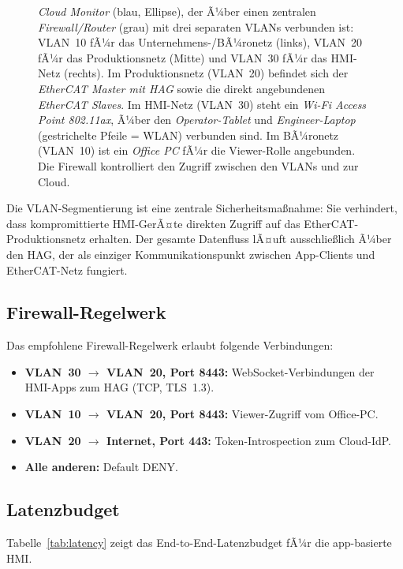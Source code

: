 ﻿\documentclass[12pt,a4paper]{article}
\begin{document}
\begin{figure}[h]
{  \emph{Cloud Monitor} (blau, Ellipse), der Ã¼ber einen zentralen \emph{Firewall/Router}
  (grau) mit drei separaten VLANs verbunden ist: VLAN~10 fÃ¼r das
  Unternehmens-/BÃ¼ronetz (links), VLAN~20 fÃ¼r das Produktionsnetz (Mitte) und
  VLAN~30 fÃ¼r das HMI-Netz (rechts). Im Produktionsnetz (VLAN~20) befindet sich der
  \emph{EtherCAT Master mit HAG} sowie die direkt angebundenen
  \emph{EtherCAT Slaves}. Im HMI-Netz (VLAN~30) steht ein \emph{Wi-Fi Access Point
  802.11ax}, Ã¼ber den \emph{Operator-Tablet} und \emph{Engineer-Laptop}
  (gestrichelte Pfeile = WLAN) verbunden sind. Im BÃ¼ronetz (VLAN~10) ist ein
  \emph{Office PC} fÃ¼r die Viewer-Rolle angebunden. Die Firewall kontrolliert den
  Zugriff zwischen den VLANs und zur Cloud.}
\label{fig:network_diagram}
\end{figure}

Die VLAN-Segmentierung ist eine zentrale Sicherheitsma\ss{}nahme: Sie verhindert, dass
kompromittierte HMI-GerÃ¤te direkten Zugriff auf das EtherCAT-Produktionsnetz erhalten.
Der gesamte Datenfluss lÃ¤uft ausschlie\ss{}lich Ã¼ber den HAG, der als einziger
Kommunikationspunkt zwischen App-Clients und EtherCAT-Netz fungiert.

\subsection{Firewall-Regelwerk}

Das empfohlene Firewall-Regelwerk erlaubt folgende Verbindungen:

\begin{itemize}[leftmargin=2em]
  \item \textbf{VLAN~30 $\to$ VLAN~20, Port 8443:} WebSocket-Verbindungen der HMI-Apps
    zum HAG (TCP, TLS~1.3).
  \item \textbf{VLAN~10 $\to$ VLAN~20, Port 8443:} Viewer-Zugriff vom Office-PC.
  \item \textbf{VLAN~20 $\to$ Internet, Port 443:} Token-Introspection zum Cloud-IdP.
  \item \textbf{Alle anderen:} Default DENY.
\end{itemize}

\subsection{Latenzbudget}

Tabelle~\ref{tab:latency} zeigt das End-to-End-Latenzbudget fÃ¼r die app-basierte HMI.
\end{document}
